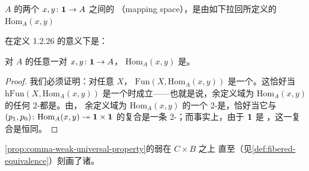 \begin{definition}[\trMappingSpace]\label{def:mapping-space}
\trInfinityCategory{} $A$ 的两个\trElement{} $x,y\colon\mathbf{1}\to A$ 之间的%
\textbf{\trMappingSpace}（mapping space），是由如下拉回\trDiagram{}所定义的%
\trCommaInfinityCategory{} $\mathrm{Hom}_A(x,y)$
\begin{center}
\end{center}
\end{definition}

\trMappingSpace{}在定义 1.2.26 的意义下是\trDiscrete{}：

\begin{proposition}\label{prop:mapping-spaces-discrete}
对\trInfinityCategory{} $A$ 的任意一对\trElement{} $x,y\colon\mathbf{1}\to A$，\trMappingSpace%
$\mathrm{Hom}_A(x,y)$ 是\trDiscrete{}。
\end{proposition}

\begin{proof}
我们必须证明：对任意\trInfinityCategory{} $X$，\trFunctorSpace{}%
$\mathrm{Fun}(X,\mathrm{Hom}_A(x,y))$ 是一个\trKanComplex{}。这恰好当%
$\mathrm{hFun}(X,\mathrm{Hom}_A(x,y))$ 是一个\trGroupoid{}时成立——也就是说，余定义域为%
$\mathrm{Hom}_A(x,y)$ 的任何 2-\trCell{}都是\trInvertible{}。由\trTwoCellConservativity{}，%
余定义域为 $\mathrm{Hom}_A(x,y)$ 的一个 2-\trCell{}是\trInvertible{}，恰好当它与%
\trIsofibration{} $(p_{1},p_{0})\colon\mathrm{Hom}_A(x,y)\twoheadrightarrow\mathbf{1}\times\mathbf{1}$%
的\trWhiskering{}复合是一条\trInvertible{} 2-\trCell{}；而事实上，由于 $\mathbf{1}$ 是%
\trTwoTerminalObject{}，这一\trWhiskering{}复合是恒同。
\end{proof}

\cref{prop:comma-weak-universal-property}的弱\trUniversalProperty{}在 $C\times B$ 之上%
直至\trFiberedEquivalence{}（见\cref{def:fibered-equivalence}）刻画了诸\trCommaInfinityCategory{}。

